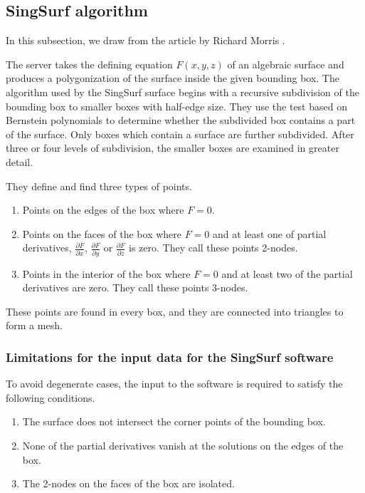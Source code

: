 \subsection{SingSurf algorithm}
In this subsection, we draw from the article by Richard Morris \cite{morris2003client}.

The server takes the defining equation $F(x, y, z)$ of an algebraic surface and 
produces a polygonization of the surface inside the given bounding box.
The algorithm used by the SingSurf surface begins with a recursive subdivision of
the bounding box to smaller boxes with half-edge size. They use the test based 
on Bernstein polynomials to determine whether the subdivided box contains a part of
the surface. Only boxes which contain a surface are further subdivided.
After three or four levels of subdivision, the smaller boxes are examined in greater detail.

They define and find three types of points.
\begin{enumerate}
    \item{Points on the edges of the box where $F=0$.}
    \item{Points on the faces of the box where $F=0$ and at least one of partial
    derivatives, $\frac{\partial F}{\partial x}$, $\frac{\partial F}{\partial y}$
    or $\frac{\partial F}{\partial z}$ is zero. They call these points 2-nodes.}
    \item{Points in the interior of the box where $F=0$ and at least two of the
    partial derivatives are zero. They call these points 3-nodes.}
\end{enumerate}

These points are found in every box, and they are connected into triangles to form 
a mesh.

\subsubsection*{Limitations for the input data for the SingSurf software}
To avoid degenerate cases, the input to the
software is required to satisfy the following conditions.
\begin{enumerate}
    \item {The surface does not intersect the corner points of the bounding box.}
    \item {None of the partial derivatives vanish at the solutions on the edges of the box.}
    \item {The 2-nodes on the faces of the box are isolated.}
\end{enumerate}

